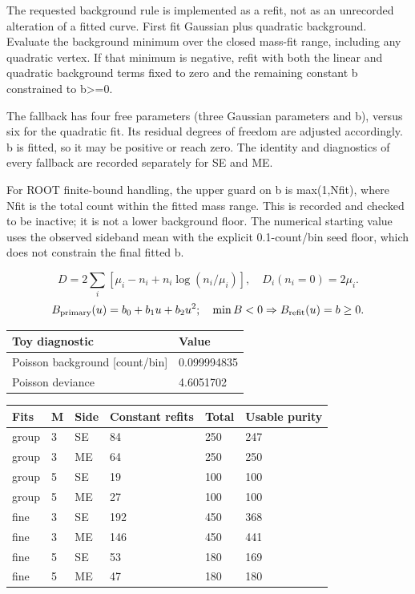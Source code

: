\documentclass[10pt,a4paper]{article}
\begin{document}
The requested background rule is implemented as a refit, not as an unrecorded alteration of a fitted curve. First fit Gaussian plus quadratic background. Evaluate the background minimum over the closed mass-fit range, including any quadratic vertex. If that minimum is negative, refit with both the linear and quadratic background terms fixed to zero and the remaining constant b constrained to b>=0.

The fallback has four free parameters (three Gaussian parameters and b), versus six for the quadratic fit. Its residual degrees of freedom are adjusted accordingly. b is fitted, so it may be positive or reach zero. The identity and diagnostics of every fallback are recorded separately for SE and ME.

For ROOT finite-bound handling, the upper guard on b is max(1,Nfit), where Nfit is the total count within the fitted mass range. This is recorded and checked to be inactive; it is not a lower background floor. The numerical starting value uses the observed sideband mean with the explicit 0.1-count/bin seed floor, which does not constrain the final fitted b.

\[D=2\sum_i[\mu_i-n_i+n_i\log(n_i/\mu_i)],\quad D_i(n_i=0)=2\mu_i.\]
\[B_{\rm primary}(u)=b_0+b_1u+b_2u^2;\quad \min B<0\Rightarrow B_{\rm refit}(u)=b\geq0.\]
{\small\setlength{\tabcolsep}{3pt}\begin{longtable}{ll}\toprule
Toy diagnostic & Value\\\midrule\endhead
Poisson background [count/bin] & 0.099994835\\
Poisson deviance & 4.6051702\\
\bottomrule\end{longtable}}
{\small\setlength{\tabcolsep}{3pt}\begin{longtable}{llllll}\toprule
Fits & M & Side & Constant refits & Total & Usable purity\\\midrule\endhead
group & 3 & SE & 84 & 250 & 247\\
group & 3 & ME & 64 & 250 & 250\\
group & 5 & SE & 19 & 100 & 100\\
group & 5 & ME & 27 & 100 & 100\\
fine & 3 & SE & 192 & 450 & 368\\
fine & 3 & ME & 146 & 450 & 441\\
fine & 5 & SE & 53 & 180 & 169\\
fine & 5 & ME & 47 & 180 & 180\\
\bottomrule\end{longtable}}
\clearpage
\end{document}
